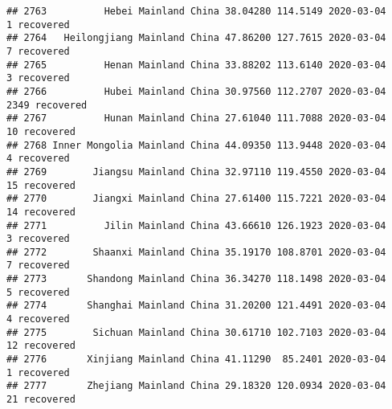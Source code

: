 \documentclass[
]{article}
\newenvironment{Shaded}{\begin{snugshade}}{\end{snugshade}}
\newcommand{\DecValTok}[1]{\textcolor[rgb]{0.00,0.00,0.81}{#1}}
\newcommand{\NormalTok}[1]{#1}
\newcommand{\OperatorTok}[1]{\textcolor[rgb]{0.81,0.36,0.00}{\textbf{#1}}}
\newcommand{\StringTok}[1]{\textcolor[rgb]{0.31,0.60,0.02}{#1}}
\begin{document}
\begin{verbatim}
## 2763          Hebei Mainland China 38.04280 114.5149 2020-03-04     1 recovered
## 2764   Heilongjiang Mainland China 47.86200 127.7615 2020-03-04     7 recovered
## 2765          Henan Mainland China 33.88202 113.6140 2020-03-04     3 recovered
## 2766          Hubei Mainland China 30.97560 112.2707 2020-03-04  2349 recovered
## 2767          Hunan Mainland China 27.61040 111.7088 2020-03-04    10 recovered
## 2768 Inner Mongolia Mainland China 44.09350 113.9448 2020-03-04     4 recovered
## 2769        Jiangsu Mainland China 32.97110 119.4550 2020-03-04    15 recovered
## 2770        Jiangxi Mainland China 27.61400 115.7221 2020-03-04    14 recovered
## 2771          Jilin Mainland China 43.66610 126.1923 2020-03-04     3 recovered
## 2772        Shaanxi Mainland China 35.19170 108.8701 2020-03-04     7 recovered
## 2773       Shandong Mainland China 36.34270 118.1498 2020-03-04     5 recovered
## 2774       Shanghai Mainland China 31.20200 121.4491 2020-03-04     4 recovered
## 2775        Sichuan Mainland China 30.61710 102.7103 2020-03-04    12 recovered
## 2776       Xinjiang Mainland China 41.11290  85.2401 2020-03-04     1 recovered
## 2777       Zhejiang Mainland China 29.18320 120.0934 2020-03-04    21 recovered
\end{verbatim}

\begin{Shaded}
\end{Shaded}
\end{document}
